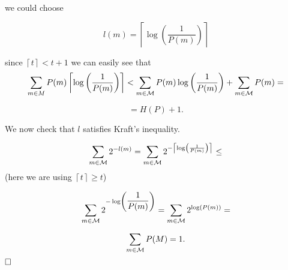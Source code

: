 we could choose

\[
l(m) = \left\lceil\log\left(\dfrac{1}{P(m)}\right)\right\rceil
\]

since $\left\lceil t \right\rceil < t + 1$ we can easily see that 
\[
\sum_{m \in M} P(m)\left\lceil\log\left(\dfrac{1}{P(m)}\right)\right\rceil < \sum_{m \in \mathcal{M}} P(m)\log\left(\dfrac{1}{P(m)}\right) + \sum_{m \in \mathcal{M}} P(m) = 
\]

\[
 = H(P) + 1.
\]

We now check that $l$ satisfies Kraft's inequality.

\[
\sum_{m \in \mathcal{M}} 2^{-l(m)} = \sum_{m \in \mathcal{M}} 2^{-\left\lceil\log\left(\frac{1}{P(m)}\right)\right\rceil} \leq
\]
(here we are using $\left\lceil t \right\rceil \geq t$)

\[
 \sum_{m \in \mathcal{M}} 2^{-\log\left(\dfrac{1}{P(m)}\right)} = \sum_{m \in \mathcal{M}} 2^{\log(P(m))} =
\]

\[
 \sum_{m \in \mathcal{M}} P(M) = 1.
\]
$\hfill\Box$